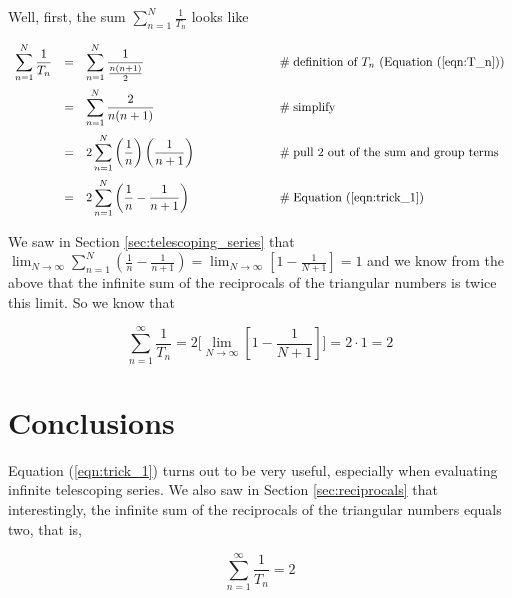 \documentclass{article}
\theoremstyle{definition}
\begin{document}
\bigskip
\noindent
Well, first, the sum ${\displaystyle \sum\limits_{n=1}^{N} \frac{1}{T_n}}$ 
looks like


\begin{equation*}
\begin{array}{lllll}
{\displaystyle \sum \limits_{n=1}^{N} \frac{1}{T_n}}
&=& {\displaystyle  \sum _{n=1}^{N} \frac{1}{\frac{n(n+1)}{2}}}
                &\qquad \qquad \qquad \mathrel{\#} \text{definition of $T_n$ 
                (Equation (\ref{eqn:T_n}))} \\
[15pt]
&=& {\displaystyle \sum _{n=1}^{N} \frac{2}{n (n+1)}}
                &\qquad \qquad \qquad \mathrel{\#} \text{simplify} \\
[15pt]
&=& {\displaystyle  2 \sum _{n=1}^{N} \left (\frac{1}{n} \right)
\left ( \frac{1}{n+1} \right )}
                &\qquad \qquad \qquad \mathrel{\#} \text{pull 2 out of the sum 
                and group terms} \\
[15pt]
&=& {\displaystyle  2 \sum\limits_{n=1}^N \left( \frac{1}{n} -
\frac{1}{n+1} \right)}
                &\qquad \qquad \qquad \mathrel{\#} 
                \text{Equation (\ref{eqn:trick_1})}
\end{array}
\end{equation*}

\bigskip
{ 
\noindent
We saw in Section \ref{sec:telescoping_series} that
${\displaystyle \lim_{N \to \infty} \sum\limits_{n=1}^N \left(
\frac{1}{n} - \frac{1}{n+1} \right ) = \lim_{N \to \infty} \left
[ 1 - \frac{1}{N+1} \right ] = 1}$ and we know from the above
that the infinite sum of the reciprocals of the triangular
numbers is twice this limit. So we know that \par}

\bigskip
\begin{equation*}
\sum \limits_{n=1}^{\infty} \frac{1}{T_n} = 2 \Bigg [  \lim_{N
\to \infty} \left  [ 1  - \frac{1}{N+1} \right ] \Bigg ]= 2 \cdot
1 =  2 
\end{equation*}


\section{Conclusions}
Equation (\ref{eqn:trick_1}) turns out to be very useful,
especially when evaluating infinite telescoping series. We also
saw in Section \ref{sec:reciprocals} that interestingly, the
infinite sum of the reciprocals of the triangular numbers equals
two, that is, 

\begin{equation*}
\displaystyle \sum \limits_{n=1}^{\infty} 
\frac{1}{T_n} =  2
\end{equation*}
\end{document}
